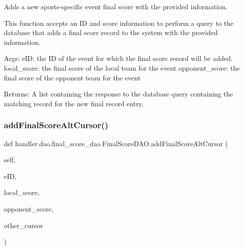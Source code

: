 \begin{DoxyVerb}Adds a new sports-specific event final score with the provided information.

This function accepts an ID and score information 
to perform a query to the database that adds a final score record 
to the system with the provided information.

Args:
    eID: the ID of the event for which the final score record will be added.
    local_score: the final score of the local team for the event
    opponent_score: the final score of the opponent team for the event
     
    
Returns:
    A list containing the response to the database query
    containing the matching record for the new final record entry. 
\end{DoxyVerb}
 \mbox{\label{classhandler_1_1dao_1_1final__score__dao_1_1_final_score_d_a_o_a3a0f69142e50d1193d01dad92e1e165f}} 
\subsubsection{\texorpdfstring{add\+Final\+Score\+Alt\+Cursor()}{addFinalScoreAltCursor()}}
{\footnotesize\ttfamily def handler.\+dao.\+final\+\_\+score\+\_\+dao.\+Final\+Score\+D\+A\+O.\+add\+Final\+Score\+Alt\+Cursor (\begin{DoxyParamCaption}\item[{}]{self,  }\item[{}]{e\+ID,  }\item[{}]{local\+\_\+score,  }\item[{}]{opponent\+\_\+score,  }\item[{}]{other\+\_\+cursor }\end{DoxyParamCaption})}

